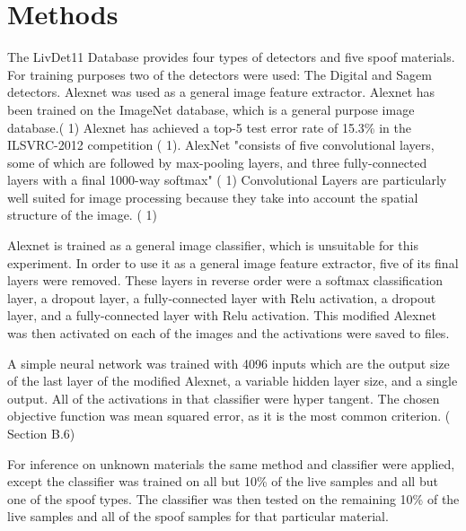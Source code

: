 \documentclass[]{article}
\begin{document}
\section{Methods}
The LivDet11 Database provides four types of detectors and five spoof materials. For training purposes two of the detectors were used: The Digital and Sagem detectors. Alexnet was used as a general image feature extractor. Alexnet has been trained on the ImageNet database, which is a general purpose image database.(\cite{alexnet} 1) Alexnet has achieved a  top-5 test error rate of 15.3\% in the ILSVRC-2012 competition (\cite{alexnet} 1). AlexNet "consists
of five convolutional layers, some of which are followed by max-pooling layers,
and three fully-connected layers with a final 1000-way softmax" (\cite{alexnet} 1) Convolutional Layers are particularly well suited for image processing because they take into account the spatial structure of the image. (\cite{convnets} 1)

Alexnet is trained as a general image classifier, which is unsuitable for this experiment.  In order to use it as a general image feature extractor, five of its final layers were removed. These layers in reverse order were a softmax classification layer, a dropout layer, a fully-connected layer with Relu activation, a dropout layer, and a fully-connected layer with Relu activation. This modified Alexnet was then activated on each of the images and the activations were saved to files. 
 
A simple neural network was trained with 4096 inputs which are the output size of the last layer of the modified Alexnet, a variable hidden layer size, and a single output. All of the activations in that classifier were hyper tangent. The chosen objective function was mean squared error, as it is the most common criterion. (\cite{book} Section B.6)

For inference on unknown materials the same method and classifier were applied, except the classifier was trained on all but 10\% of the live samples and all but one of the spoof types. The classifier was then tested on the remaining 10\% of the live samples and all of the spoof samples for that particular material. 
\end{document}
